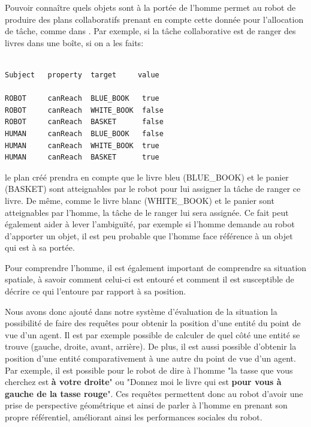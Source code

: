 \documentclass[a4paper,11pt,twoside]{StyleThese}
\begin{document}
Pouvoir connaître quels objets sont à la portée de l'homme permet au robot de produire des plans collaboratifs prenant en compte cette donnée pour l'allocation de tâche, comme dans \cite{gharbi2015}.
Par exemple, si la tâche collaborative est de ranger des livres dans une boîte, si on a les faits:

\begin{scriptsize}
\begin{verbatim}

Subject   property  target     value

ROBOT     canReach  BLUE_BOOK   true
ROBOT     canReach  WHITE_BOOK  false
ROBOT     canReach  BASKET      false
HUMAN     canReach  BLUE_BOOK   false
HUMAN     canReach  WHITE_BOOK  true
HUMAN     canReach  BASKET      true
\end{verbatim}
\end{scriptsize}

le plan créé prendra en compte que le livre bleu (BLUE\_BOOK) et le panier (BASKET) sont atteignables par le robot pour lui assigner la tâche de ranger ce livre. De même, comme le livre blanc (WHITE\_BOOK) et le panier sont atteignables par l'homme, la tâche de le ranger lui sera assignée.
Ce fait peut également aider à lever l'ambiguïté, par exemple si l'homme demande au robot d'apporter un objet, il est peu probable que l'homme face référence à un objet qui est à sa portée.

Pour comprendre l'homme, il est également important de comprendre sa situation spatiale, à savoir comment celui-ci est entouré et comment il est susceptible de décrire ce qui l'entoure par rapport à sa position.

Nous avons donc ajouté dans notre système d'évaluation de la situation la possibilité de faire des requêtes pour obtenir la position d'une entité du point de vue d'un agent. Il est par exemple possible de calculer de quel côté une entité se trouve (gauche, droite, avant, arrière).
De plus, il est aussi possible d'obtenir la position d'une entité comparativement à une autre du point de vue d'un agent. Par exemple, il est possible pour le robot de dire à l'homme "la tasse que vous cherchez est \textbf{à votre droite}" ou "Donnez moi le livre qui est \textbf{pour vous à gauche de la tasse rouge}".
Ces requêtes permettent donc au robot d'avoir une prise de perspective géométrique et ainsi de parler à l'homme en prenant son propre référentiel, améliorant ainsi les performances sociales du robot.
\end{document}
